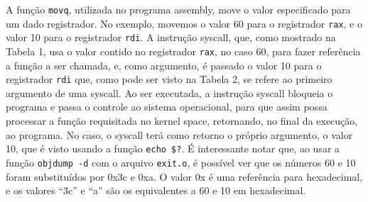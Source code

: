 A função \texttt{movq}, utilizada no programa assembly, move o valor
especificado para um dado registrador. No exemplo, movemos o valor 60
para o registrador \texttt{rax}, e o valor 10 para o registrador
\texttt{rdi}. A instrução syscall, que, como mostrado na Tabela 1, usa o
valor contido no registrador \texttt{rax}, no caso 60, para fazer
referência a função a ser chamada, e, como argumento, é passado o valor
10 para o registrador \texttt{rdi} que, como pode ser visto na Tabela 2,
se refere ao primeiro argumento de uma syscall. Ao ser executada, a
instrução syscall bloqueia o programa e passa o controle ao sistema
operacional, para que assim possa processar a função requisitada no
kernel space, retornando, no final da execução, ao programa. No caso, o
syscall terá como retorno o próprio argumento, o valor 10, que é visto
usando a função \texttt{echo\ \$?}. É interessante notar que, ao usar a
função \texttt{objdump\ -d} com o arquivo \texttt{exit.o}, é possível
ver que os números 60 e 10 foram substituídos por 0x3c e 0xa. O valor 0x
é uma referência para hexadecimal, e os valores ``3c'' e ``a'' são os
equivalentes a 60 e 10 em hexadecimal.